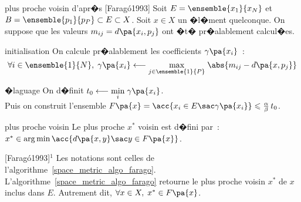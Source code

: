             \begin{xalgorithm}{plus proche voisin d'apr�s [Farag\'o1993]}\label{space_metric_algo_farago}
            Soit $E = \ensemble{x_1}{x_N}$ et $B = \ensemble{p_1}{p_P} \subset E \subset X$. Soit $x \in X$ 
            un �l�ment quelconque. 
            On suppose que les valeurs $m_{ij} = d\pa{x_i, p_j}$ ont �t� pr�alablement calcul�es.
            
            \begin{xalgostep}{initialisation}
            On calcule pr�alablement les coefficients $\gamma\pa{x_i}$~:
                              $$
                                \forall i \in \ensemble{1}{N}, \; \gamma\pa{x_i} \longleftarrow \underset{j 
                                                        \in \ensemble{1}{P} } {\max} \;
                                            \abs{ m_{ij} - d\pa{x,p_j} }
                                $$
            \end{xalgostep}        
            
            \begin{xalgostep}{�laguage}
            On d�finit $t_0 \longleftarrow \underset{i} {\min} \; \gamma\pa{x_i}$. \\
            Puis on construit l'ensemble $F\pa{x} = \acc{ x_i \in E \sac \gamma\pa{x_i} }\leqslant
                         \frac{\alpha}{\beta} \, t_0$.
            \end{xalgostep}        
            
            \begin{xalgostep}{plus proche voisin}
            Le plus proche $x^*$ voisin est d�fini par~: $x^* \in \arg \min \acc{ d\pa{x,y} \sac y \in F\pa{x}}$.
            \end{xalgostep}        
            
            \end{xalgorithm}



            \begin{xtheorem}{[Farag\'o1993]$^1$}
                                                                \label{space_metric_farago_1}
            Les notations sont celles de l'algorithme~\ref{space_metric_algo_farago}.        
            L'algorithme~\ref{space_metric_algo_farago} retourne le plus proche voisin $x^*$ de $x$ inclus dans $E$. 
            Autrement dit, $\forall x \in X, \; x^* \in F\pa{x}$.
            \end{xtheorem}



